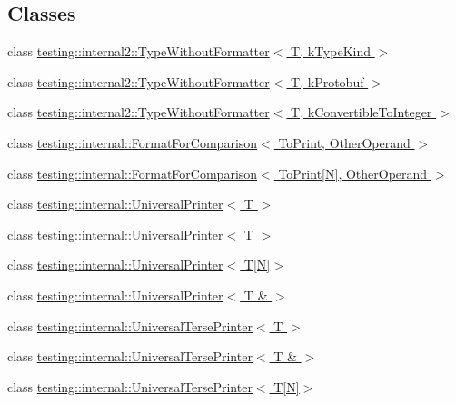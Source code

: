 \subsection*{Classes}
\begin{DoxyCompactItemize}
\item 
class \hyperlink{classtesting_1_1internal2_1_1TypeWithoutFormatter}{testing\+::internal2\+::\+Type\+Without\+Formatter$<$ T, k\+Type\+Kind $>$}
\item 
class \hyperlink{classtesting_1_1internal2_1_1TypeWithoutFormatter_3_01T_00_01kProtobuf_01_4}{testing\+::internal2\+::\+Type\+Without\+Formatter$<$ T, k\+Protobuf $>$}
\item 
class \hyperlink{classtesting_1_1internal2_1_1TypeWithoutFormatter_3_01T_00_01kConvertibleToInteger_01_4}{testing\+::internal2\+::\+Type\+Without\+Formatter$<$ T, k\+Convertible\+To\+Integer $>$}
\item 
class \hyperlink{classtesting_1_1internal_1_1FormatForComparison}{testing\+::internal\+::\+Format\+For\+Comparison$<$ To\+Print, Other\+Operand $>$}
\item 
class \hyperlink{classtesting_1_1internal_1_1FormatForComparison_3_01ToPrint[N]_00_01OtherOperand_01_4}{testing\+::internal\+::\+Format\+For\+Comparison$<$ To\+Print\mbox{[}\+N\mbox{]}, Other\+Operand $>$}
\item 
class \hyperlink{classtesting_1_1internal_1_1UniversalPrinter}{testing\+::internal\+::\+Universal\+Printer$<$ T $>$}
\item 
class \hyperlink{classtesting_1_1internal_1_1UniversalPrinter}{testing\+::internal\+::\+Universal\+Printer$<$ T $>$}
\item 
class \hyperlink{classtesting_1_1internal_1_1UniversalPrinter_3_01T[N]_4}{testing\+::internal\+::\+Universal\+Printer$<$ T\mbox{[}\+N\mbox{]}$>$}
\item 
class \hyperlink{classtesting_1_1internal_1_1UniversalPrinter_3_01T_01_6_01_4}{testing\+::internal\+::\+Universal\+Printer$<$ T \& $>$}
\item 
class \hyperlink{classtesting_1_1internal_1_1UniversalTersePrinter}{testing\+::internal\+::\+Universal\+Terse\+Printer$<$ T $>$}
\item 
class \hyperlink{classtesting_1_1internal_1_1UniversalTersePrinter_3_01T_01_6_01_4}{testing\+::internal\+::\+Universal\+Terse\+Printer$<$ T \& $>$}
\item 
class \hyperlink{classtesting_1_1internal_1_1UniversalTersePrinter_3_01T[N]_4}{testing\+::internal\+::\+Universal\+Terse\+Printer$<$ T\mbox{[}\+N\mbox{]}$>$}

\end{DoxyCompactItemize}
